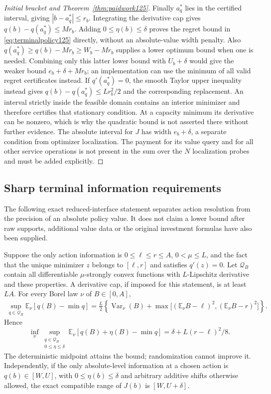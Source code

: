 \begin{proof}[Initial bracket and Theorem~\ref{thm:paidwork125}]
Finally $a_q^*$ lies in the certified interval, giving
$|b-a_q^*|\le r_b$. Integrating the derivative cap gives
$q(b)-q(a_q^*)\le Mr_b$. Adding $0\le\eta(b)\le\delta$
proves the regret bound in \eqref{eq:terminalpolicy125} directly,
without an absolute-value width penalty. Also
$q(a_q^*)\ge q(b)-Mr_b\ge W_b-Mr_b$ supplies a lower optimum
bound when one is needed. Combining only this latter lower bound
with $U_b+\delta$ would give the weaker bound
$e_b+\delta+Mr_b$; an implementation can use the minimum of
all valid regret certificates instead. If $q'(a_q^*)=0$,
the smooth Taylor upper inequality instead gives
$q(b)-q(a_q^*)\le Lr_b^2/2$ and the corresponding replacement.
An interval strictly inside the feasible domain contains an
interior minimizer and therefore certifies that stationary condition.
At a capacity minimum its derivative can be nonzero, which is why
the quadratic bound is not asserted there without further evidence.
The absolute interval for $J$ has width $e_b+\delta$, a separate
condition from optimizer localization. The payment for its value
query and for all other service operations is not present in the
sum over the $N$ localization probes and must be added explicitly.
\end{proof}

\subsection{Sharp terminal information requirements}

The following exact reduced-interface statement separates action
resolution from the precision of an absolute policy value. It does
not claim a lower bound after raw supports, additional value data or
the original investment formulas have also been supplied.

\begin{proposition}
\label{prop:terminalminimax125}
Suppose the only action information is $0\le\ell\le r\le A$,
$0<\mu\le L$, and the fact that the unique minimizer $z$ belongs
to $[\ell,r]$ and satisfies $q'(z)=0$. Let $\mathcal Q_B$ contain
all differentiable $\mu$-strongly convex functions with
$L$-Lipschitz derivative and these properties. A derivative cap,
if imposed for this statement, is at least $LA$.
For every Borel law $\nu$ of $B\in[0,A]$,
\begin{align*}
 \sup_{q\in\mathcal Q_B}\mathbb E_\nu[q(B)-\min q]
 =\frac L2\left\{\operatorname{Var}_\nu(B)+
     \max\big[(\mathbb E_\nu B-\ell)^2,
              (\mathbb E_\nu B-r)^2\big]\right\}.
\end{align*}
Hence
\[
 \inf_\nu\sup_{\substack{q\in\mathcal Q_B\\0\le\eta\le\delta}}
 \mathbb E_\nu[q(B)+\eta(B)-\min q]
                   =\delta+L(r-\ell)^2/8.
\]
The deterministic midpoint attains the bound; randomization cannot
improve it. Independently, if the only absolute-level information at
a chosen action is $q(b)\in[W,U]$, with $0\le\eta(b)\le\delta$
and arbitrary additive shifts otherwise allowed, the exact compatible
range of $J(b)$ is $[W,U+\delta]$.
\end{proposition}

